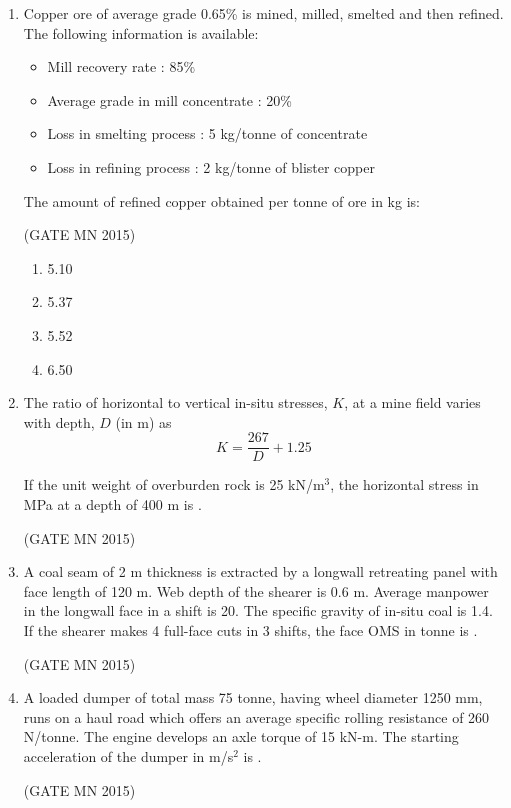 \documentclass[journal]{IEEEtran}
\begin{document}
\begin{enumerate}
\item Copper ore of average grade 0.65\% is mined, milled, smelted and then refined. The following information is available:

\begin{itemize}
\item Mill recovery rate : 85\%
\item Average grade in mill concentrate : 20\%
\item Loss in smelting process : 5 kg/tonne of concentrate
\item Loss in refining process : 2 kg/tonne of blister copper
\end{itemize}

The amount of refined copper obtained per tonne of ore in kg is:

\hfill(GATE MN 2015)

\begin{multicols}{4}
\begin{enumerate}
\item 5.10
\item 5.37
\item 5.52
\item 6.50
\end{enumerate}
\end{multicols}


\item The ratio of horizontal to vertical in-situ stresses, \(K\), at a mine field varies with depth, \(D\) (in m) as
\[
K = \frac{267}{D} + 1.25
\]

If the unit weight of overburden rock is 25 kN/m$^3$, the horizontal stress in MPa at a depth of 400 m is \underline{\hspace{2cm}}.


\hfill(GATE MN 2015)

\item A coal seam of 2 m thickness is extracted by a longwall retreating panel with face length of 120 m. Web depth of the shearer is 0.6 m. Average manpower in the longwall face in a shift is 20. The specific gravity of in-situ coal is 1.4. If the shearer makes 4 full-face cuts in 3 shifts, the face OMS in tonne is \underline{\hspace{2cm}}.

	\hfill(GATE MN 2015)


\item A loaded dumper of total mass 75 tonne, having wheel diameter 1250 mm, runs on a haul road which offers an average specific rolling resistance of 260 N/tonne. The engine develops an axle torque of 15 kN-m. The starting acceleration of the dumper in m/s$^2$ is \underline{\hspace{2cm}}.

	\hfill(GATE MN 2015)


\end{enumerate}
\end{document}
